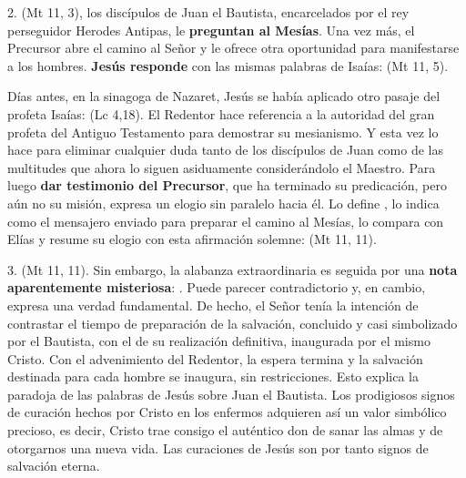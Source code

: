 \begin{body}
\begin{body}
2.  (Mt 11, 3), los discípulos de Juan el Bautista, encarcelados por el rey perseguidor Herodes Antipas, le \textbf{preguntan al Mesías}.  Una vez más, el Precursor abre el camino al Señor y le ofrece otra oportunidad para manifestarse a los hombres. \textbf{Jesús responde} con las mismas palabras de Isaías:  (Mt 11, 5).

Días antes, en la sinagoga de Nazaret, Jesús se había aplicado otro pasaje del profeta Isaías:  (Lc 4,18). El Redentor hace referencia a la autoridad del gran profeta del Antiguo Testamento para demostrar su mesianismo. Y esta vez lo hace para eliminar cualquier duda tanto de los discípulos de Juan como de las multitudes que ahora lo siguen asiduamente considerándolo el Maestro. Para luego \textbf{dar testimonio del Precursor}, que ha terminado su predicación, pero aún no su misión, expresa un elogio sin paralelo hacia él. Lo define , lo indica como el mensajero enviado para preparar el camino al Mesías, lo compara con Elías y resume su elogio con esta afirmación solemne:  (Mt 11, 11).

3.  (Mt 11, 11). Sin embargo, la alabanza extraordinaria es seguida por una \textbf{nota aparentemente misteriosa}: . Puede parecer contradictorio y, en cambio, expresa una verdad fundamental. De hecho, el Señor tenía la intención de contrastar el tiempo de preparación de la salvación, concluido y casi simbolizado por el Bautista, con el de su realización definitiva, inaugurada por el mismo Cristo. Con el advenimiento del Redentor, la espera termina y la salvación destinada para cada hombre se inaugura, sin restricciones. Esto explica la paradoja de las palabras de Jesús sobre Juan el Bautista. Los prodigiosos signos de curación hechos por Cristo en los enfermos adquieren así un valor simbólico precioso, es decir, Cristo trae consigo el auténtico don de sanar las almas y de otorgarnos una nueva vida. Las curaciones de Jesús son por tanto signos de salvación eterna.


\end{body}
\end{body}
